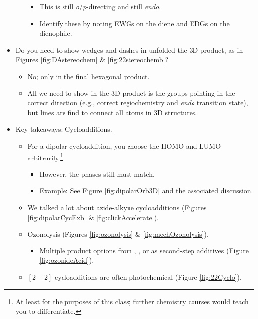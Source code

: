 \documentclass[../notes.tex]{subfiles}
\begin{document}
\begin{itemize}
\begin{itemize}
        \begin{itemize}
            \item This is still \emph{o}/\emph{p}-directing and still \emph{endo}.
            \item Identify these by noting EWGs on the diene and EDGs on the dienophile.
        \end{itemize}
    \end{itemize}
    \item Do you need to show wedges and dashes in unfolded the 3D product, as in Figures \ref{fig:DAstereochem} \& \ref{fig:22stereochemb}?
    \begin{itemize}
        \item No; only in the final hexagonal product.
        \item All we need to show in the 3D product is the groups pointing in the correct direction (e.g., correct regiochemistry and \emph{endo} transition state), but lines are find to connect all atoms in 3D structures.
    \end{itemize}
    \item Key takeaways: Cycloadditions.
    \begin{itemize}
        \item For a dipolar cycloaddition, you choose the HOMO and LUMO arbitrarily.\footnote{At least for the purposes of this class; further chemistry courses would teach you to differentiate.}
        \begin{itemize}
            \item However, the phases still must match.
            \item Example: See Figure \ref{fig:dipolarOrb3D} and the associated discussion.
        \end{itemize}
        \item We talked a lot about azide-alkyne cycloadditions (Figures \ref{fig:dipolarCycExb} \& \ref{fig:clickAccelerate}).
        \item Ozonolysis (Figures \ref{fig:ozonolysis} \& \ref{fig:mechOzonolysis}).
        \begin{itemize}
            \item Multiple product options from , , or  as second-step additives (Figure \ref{fig:ozonideAcid}).
        \end{itemize}
        \item $[2+2]$ cycloadditions are often photochemical (Figure \ref{fig:22Cyclo}).
        \begin{itemize}

\end{itemize}
\end{itemize}
\end{itemize}
\end{document}
